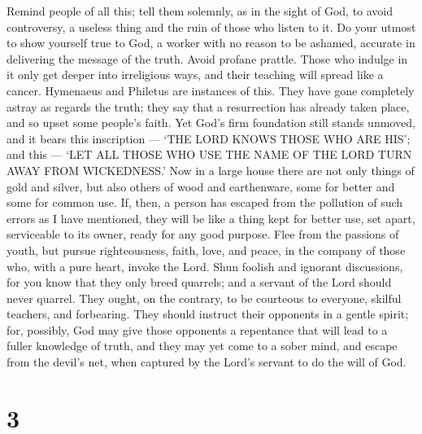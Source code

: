  Remind people of all this; tell them solemnly, as in the
sight of God, to avoid controversy, a useless thing and the ruin of
those who listen to it.  Do your utmost to show yourself
true to God, a worker with no reason to be ashamed, accurate in
delivering the message of the truth.  Avoid profane
prattle. Those who indulge in it only get deeper into irreligious ways,
 and their teaching will spread like a cancer. Hymenaeus
and Philetus are instances of this.  They have gone
completely astray as regards the truth; they say that a resurrection has
already taken place, and so upset some people's faith.  Yet
God's firm foundation still stands unmoved, and it bears this
inscription --- `THE LORD KNOWS THOSE WHO ARE HIS'; and this --- `LET
ALL THOSE WHO USE THE NAME OF THE LORD TURN AWAY FROM WICKEDNESS.'
 Now in a large house there are not only things of gold and
silver, but also others of wood and earthenware, some for better and
some for common use.  If, then, a person has escaped from
the pollution of such errors as I have mentioned, they will be like a
thing kept for better use, set apart, serviceable to its owner, ready
for any good purpose.  Flee from the passions of youth, but
pursue righteousness, faith, love, and peace, in the company of those
who, with a pure heart, invoke the Lord.  Shun foolish and
ignorant discussions, for you know that they only breed quarrels;
 and a servant of the Lord should never quarrel. They
ought, on the contrary, to be courteous to everyone, skilful teachers,
and forbearing.  They should instruct their opponents in a
gentle spirit; for, possibly, God may give those opponents a repentance
that will lead to a fuller knowledge of truth,  and they
may yet come to a sober mind, and escape from the devil's net, when
captured by the Lord's servant to do the will of God.

\hypertarget{section-2}{%
\section{3}\label{section-2}}

